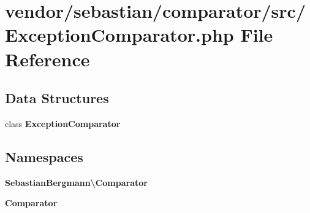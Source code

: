 \section{vendor/sebastian/comparator/src/\+Exception\+Comparator.php File Reference}
\label{_exception_comparator_8php}
\subsection*{Data Structures}
\begin{DoxyCompactItemize}
\item 
class {\bf Exception\+Comparator}
\end{DoxyCompactItemize}
\subsection*{Namespaces}
\begin{DoxyCompactItemize}
\item 
 {\bf Sebastian\+Bergmann\textbackslash{}\+Comparator}
\item 
 {\bf Comparator}
\end{DoxyCompactItemize}
